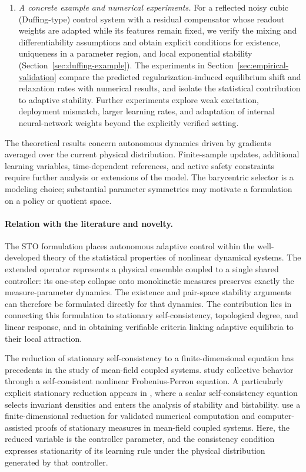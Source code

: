 \documentclass[11pt]{article}
\theoremstyle{definition}
\theoremstyle{remark}
\begin{document}
\begin{enumerate}[label=(\roman*)]
  \item \emph{A concrete example and numerical experiments.}
  For a reflected noisy cubic (Duffing-type) control system 
  with a residual compensator whose readout weights are adapted
  while its features remain fixed, we verify the mixing and 
  differentiability assumptions and obtain explicit conditions 
  for existence, uniqueness in a parameter region, and local 
  exponential stability (Section~\ref{sec:duffing-example}).
  The experiments in Section~\ref{sec:empirical-validation}
  compare the predicted regularization-induced equilibrium
  shift and relaxation rates with numerical results, and
  isolate the statistical contribution to adaptive stability.
  Further experiments explore weak excitation, deployment
  mismatch, larger learning rates, and adaptation of internal
  neural-network weights beyond the explicitly verified setting.

\end{enumerate}

The theoretical results concern autonomous dynamics driven by
gradients averaged over the current physical distribution.
Finite-sample updates, additional learning variables,
time-dependent references, and active safety constraints
require further analysis or extensions of the model.
The barycentric selector is a modeling choice; substantial
parameter symmetries may motivate a formulation on a policy
or quotient space.



\paragraph{Relation with the literature and novelty.}
The STO formulation places autonomous adaptive control within the well-developed theory  of the  statistical properties of nonlinear dynamical systems.  The extended operator represents a physical ensemble coupled to a single shared controller: its one-step collapse onto monokinetic measures preserves exactly the measure-parameter dynamics. The existence and pair-space stability arguments can therefore be formulated directly for that dynamics. The contribution lies in connecting this formulation to stationary self-consistency, topological degree, and linear response,
and in obtaining verifiable criteria linking adaptive equilibria to
their local attraction. 

The reduction of stationary self-consistency to a
finite-dimensional equation has precedents in the study
of mean-field coupled systems.
\cite{APK} study collective behavior
through a self-consistent nonlinear Frobenius-Perron equation.
A particularly explicit stationary reduction appears in \cite{BKZ}, where a scalar
self-consistency equation selects invariant densities and
enters the analysis of stability and bistability.
 \cite{GNT} use a finite-dimensional
reduction for validated numerical computation and
computer-assisted proofs of stationary measures in
mean-field coupled systems.
Here, the reduced variable is the controller parameter,
and the consistency condition expresses stationarity of
its learning rule under the physical distribution generated
by that controller.
\end{document}
